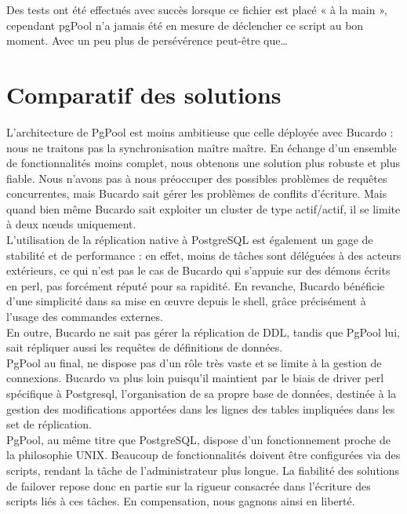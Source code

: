 \documentclass[12pt]{report}
\begin{document}
Des tests ont été effectués avec succès lorsque ce fichier est placé « à la main
», cependant pgPool n'a jamais été en mesure de déclencher ce script au bon
moment. Avec un peu plus de persévérence peut-être que… \\

\section{Comparatif des solutions}

L'architecture de PgPool est moins ambitieuse que celle déployée avec Bucardo :
nous ne traitons pas la synchronisation maître maître. En échange d’un ensemble
de fonctionnalités moins complet, nous obtenons une solution plus robuste et
plus fiable. Nous n’avons pas à nous préoccuper des possibles problèmes de
requêtes concurrentes, mais Bucardo sait gérer les problèmes de conflits
d'écriture. Mais quand bien même Bucardo sait exploiter un cluster de type
actif/actif, il se limite à deux nœuds uniquement.\\

L’utilisation de la réplication native à PostgreSQL est également un gage de
stabilité et de performance : en effet, moins de tâches sont déléguées à des
acteurs extérieurs, ce qui n'est pas le cas de Bucardo qui s'appuie sur des
démons écrits en perl, pas forcément réputé pour sa rapidité. En revanche,
Bucardo bénéficie d'une simplicité dans sa mise en œuvre depuis le shell, grâce
précisément à l'usage des commandes externes.\\

En outre, Bucardo ne sait pas gérer la réplication de DDL, tandis que PgPool
lui, sait répliquer aussi les requêtes de définitions de données.\\


PgPool au final, ne dispose pas d’un rôle très vaste et se limite à la gestion
de connexions. Bucardo va plus loin puisqu'il maintient par le biais de driver
perl spécifique à Postgresql, l'organisation de sa propre base de données,
destinée à la gestion des modifications apportées dans les lignes des tables
impliquées dans les set de réplication.\\

PgPool, au même titre que PostgreSQL, dispose d’un fonctionnement proche de la
philosophie UNIX. Beaucoup de fonctionnalités doivent être configurées via des
scripts, rendant la tâche de l’administrateur plus longue. La fiabilité des
solutions de failover repose donc en partie sur la rigueur consacrée dans
l’écriture des scripts liés à ces tâches. En compensation, nous gagnons ainsi en
liberté.\\
\end{document}
